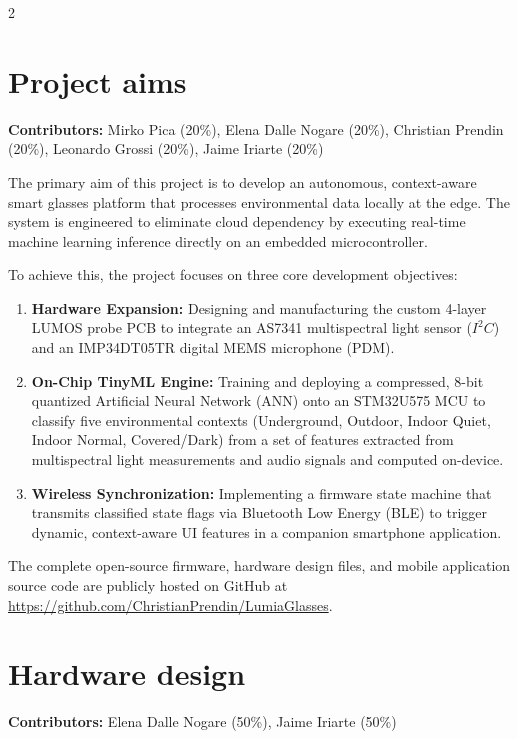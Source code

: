 \documentclass[10pt]{article}
\begin{document}
\begin{multicols}{2}
\section{Project aims}
\noindent\textbf{Contributors:} Mirko Pica (20\%), Elena Dalle Nogare (20\%), Christian Prendin (20\%), Leonardo Grossi (20\%), Jaime Iriarte (20\%)
\vspace{0.1cm}

The primary aim of this project is to develop an autonomous, context-aware smart glasses platform that processes environmental data locally at the edge. The system is engineered to eliminate cloud dependency by executing real-time machine learning inference directly on an embedded microcontroller.

To achieve this, the project focuses on three core development objectives:
\begin{enumerate}
    \item \textbf{Hardware Expansion:} Designing and manufacturing the custom 4-layer LUMOS probe PCB to integrate an AS7341 multispectral light sensor ($I^2C$) and an IMP34DT05TR digital MEMS microphone (PDM).
    \item \textbf{On-Chip TinyML Engine:} Training and deploying a compressed, 8-bit quantized Artificial Neural Network (ANN) onto an STM32U575 MCU to classify five environmental contexts (Underground, Outdoor, Indoor Quiet, Indoor Normal, Covered/Dark) from a set of features extracted from multispectral light measurements and audio signals and computed on-device.
    \item \textbf{Wireless Synchronization:} Implementing a firmware state machine that transmits classified state flags via Bluetooth Low Energy (BLE) to trigger dynamic, context-aware UI features in a companion smartphone application.
\end{enumerate}

The complete open-source firmware, hardware design files, and mobile application source code are publicly hosted on GitHub at \url{https://github.com/ChristianPrendin/LumiaGlasses}.

\section{Hardware design}
\noindent\textbf{Contributors:} Elena Dalle Nogare (50\%), Jaime Iriarte (50\%)
\vspace{0.1cm}


\end{multicols}
\end{document}
